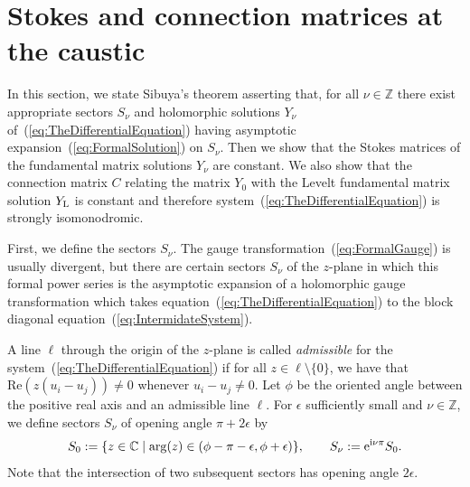 \documentclass[10pt,a4paper]{amsart}
\numberwithin{equation}{section}
\begin{document}
\section{Stokes and connection matrices at the caustic}
\label{sec:StokesMatrices}
In this section, we state Sibuya's theorem asserting that, for all $\nu\in\mathbb{Z}$ there exist appropriate sectors $S_{\nu}$ and holomorphic solutions $Y_{\nu}$ of~(\ref{eq:TheDifferentialEquation}) having asymptotic expansion~(\ref{eq:FormalSolution}) on $S_{\nu}$. Then we show that the Stokes matrices of the fundamental matrix solutions $Y_{\nu}$ are constant. We also show that the connection matrix $C$ relating the matrix $Y_{0}$ with the Levelt fundamental matrix solution $Y_{\rm L}$ is constant and therefore system~(\ref{eq:TheDifferentialEquation}) is strongly isomonodromic.

First, we define the sectors $S_{\nu}$. The gauge transformation~(\ref{eq:FormalGauge}) is usually divergent, but there are certain sectors $S_{\nu}$ of the $z$-plane in which this formal power series is the asymptotic expansion of a holomorphic gauge transformation which takes equation~(\ref{eq:TheDifferentialEquation}) to the block diagonal equation~(\ref{eq:IntermidateSystem}).
\begin{Definition}
 A line $\ell$ through the origin of the $z$-plane is called \emph{admissible} for the system~(\ref{eq:TheDifferentialEquation}) if for all $z\in\ell\setminus\{ 0 \}$, we have that $\mathrm{Re}(z(u_{i}-u_{j}))\neq 0$ whenever $u_{i}-u_{j}\neq 0$. Let $\phi$ be the oriented angle between the positive real axis and an admissible line $\ell$. For $\epsilon$ sufficiently small and $\nu\in\mathbb{Z}$, we define sectors $S_{\nu}$ of opening angle $\pi+2\epsilon$ by
 \begin{equation*}
 S_{0}:=\{z\in\mathbb{C}\mid \arg(z)\in(\phi-\pi-\epsilon,\phi+\epsilon)\},\qquad
 S_{\nu}:={\rm e}^{{\rm i}\nu\pi}S_{0}.
 \end{equation*}
Note that the intersection of two subsequent sectors has opening angle $2\epsilon$.
\end{Definition}
\end{document}
